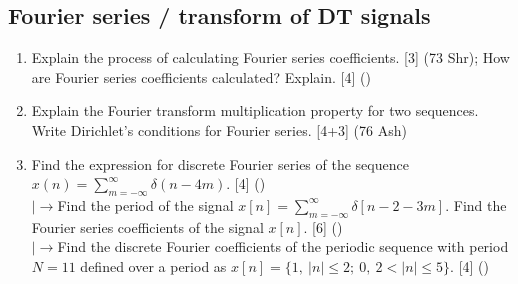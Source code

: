 \documentclass[12pt]{article}
\newcommand{\lb}{\\$\left|\rightarrow\right.$}
\begin{document}
  \subsection{Fourier series / transform of DT signals}
    \begin{enumerate}[topsep=0pt, noitemsep]
      \item Explain the process of calculating Fourier series coefficients. \hfill [3] (73 Shr); How are Fourier series coefficients calculated? Explain. \hfill [4] ()

      \item Explain the Fourier transform multiplication property for two sequences. Write Dirichlet's conditions for Fourier series. \hfill [4+3] (76 Ash)

      \item Find the expression for discrete Fourier series of the sequence $x(n)=\sum_{m=-\infty}^{\infty}\delta(n-4m)$. \hfill [4] ()
        \lb Find the period of the signal $x[n]=\sum_{m=-\infty}^{\infty}\delta[n-2-3m]$. Find the Fourier series coefficients of the signal $x[n]$. \hfill [6] ()
        \lb Find the discrete Fourier coefficients of the periodic sequence with period $N=11$ defined over a period as $x[n]=\{1,\ |n|\le2;\ 0,\ 2<|n|\le5\}$. \hfill [4] ()
    \end{enumerate}
\end{document}
